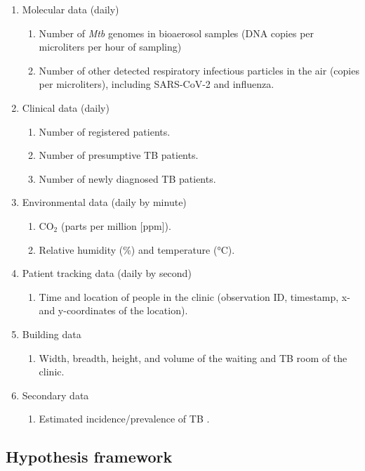 \documentclass{article}
\begin{document}
\begin{enumerate}
    \item Molecular data (daily)
    \begin{enumerate}
        \item Number of \emph{Mtb} genomes in bioaerosol samples (DNA copies per microliters per hour of sampling)
        \item Number of other detected respiratory infectious particles in the air (copies per microliters), including SARS-CoV-2 and influenza. 
    \end{enumerate}
    \item Clinical data (daily)
    \begin{enumerate}
        \item Number of registered patients.
        \item Number of presumptive TB patients.
        \item Number of newly diagnosed TB patients.
    \end{enumerate}
    \item Environmental data (daily by minute)
    \begin{enumerate}
        \item CO$_2$ (parts per million [ppm]).
        \item Relative humidity (\%) and temperature (°C).
    \end{enumerate}
    \item Patient tracking data (daily by second)
    \begin{enumerate}
        \item Time and location of people in the clinic (observation ID, timestamp, x- and y-coordinates of the location).
    \end{enumerate}
    \item Building data
    \begin{enumerate}
        \item Width, breadth, height, and volume of the waiting and TB room of the clinic.
    \end{enumerate}
    \item Secondary data
    \begin{enumerate}
        \item Estimated incidence/prevalence of TB \cite{WHO2022TBReport}.
    \end{enumerate}
\end{enumerate}

\subsection{Hypothesis framework}
\end{document}
